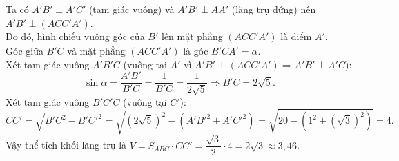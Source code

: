 \begin{ex}
{{
        }
        Ta có $A'B' \perp A'C'$ (tam giác vuông) và $A'B' \perp AA'$ (lăng trụ đứng) nên $A'B' \perp (ACC'A')$.\\
        Do đó, hình chiếu vuông góc của $B'$ lên mặt phẳng $(ACC'A')$ là điểm $A'$.\\
        Góc giữa $B'C$ và mặt phẳng $(ACC'A')$ là góc $\widehat{B'CA'} = \alpha$.\\
        Xét tam giác vuông $A'B'C$ (vuông tại $A'$ vì $A'B' \perp (ACC'A') \Rightarrow A'B' \perp A'C$):
        \[ \sin\alpha = \dfrac{A'B'}{B'C} = \dfrac{1}{B'C} = \dfrac{1}{2\sqrt{5}} \Rightarrow B'C = 2\sqrt{5}. \]
        Xét tam giác vuông $B'C'C$ (vuông tại $C'$):
        \[ CC' = \sqrt{B'C^2 - B'C'^2} = \sqrt{(2\sqrt{5})^2 - (A'B'^2 + A'C'^2)}= \sqrt{20 - (1^2 + (\sqrt{3})^2)}=4. \]
        Vậy thể tích khối lăng trụ là $ V = S_{ABC} \cdot CC' = \dfrac{\sqrt{3}}{2} \cdot 4 = 2\sqrt{3} \approx 3{,}46$.
    }
\end{ex}
